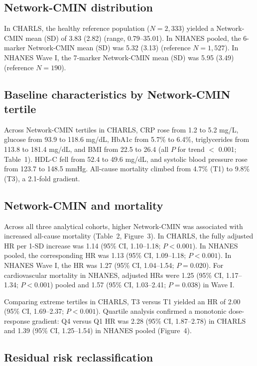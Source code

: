 \documentclass[11pt,a4paper]{article}
\begin{document}
\subsection{Network-CMIN distribution}

In CHARLS, the healthy reference population ($N = 2{,}333$) yielded a Network-CMIN mean (SD) of 3.83 (2.82) (range, 0.79--35.01). In NHANES pooled, the 6-marker Network-CMIN mean (SD) was 5.32 (3.13) (reference $N = 1{,}527$). In NHANES Wave I, the 7-marker Network-CMIN mean (SD) was 5.95 (3.49) (reference $N = 190$).

\subsection{Baseline characteristics by Network-CMIN tertile}

Across Network-CMIN tertiles in CHARLS, CRP rose from 1.2 to 5.2 mg/L, glucose from 93.9 to 118.6 mg/dL, HbA1c from 5.7\% to 6.4\%, triglycerides from 113.8 to 181.4 mg/dL, and BMI from 22.5 to 26.4 (all $P$ for trend $<$ 0.001; Table~1). HDL-C fell from 52.4 to 49.6 mg/dL, and systolic blood pressure rose from 123.7 to 148.5 mmHg. All-cause mortality climbed from 4.7\% (T1) to 9.8\% (T3), a 2.1-fold gradient.

\subsection{Network-CMIN and mortality}

Across all three analytical cohorts, higher Network-CMIN was associated with increased all-cause mortality (Table~2, Figure~3). In CHARLS, the fully adjusted HR per 1-SD increase was 1.14 (95\% CI, 1.10--1.18; $P < 0.001$). In NHANES pooled, the corresponding HR was 1.13 (95\% CI, 1.09--1.18; $P < 0.001$). In NHANES Wave I, the HR was 1.27 (95\% CI, 1.04--1.54; $P = 0.020$). For cardiovascular mortality in NHANES, adjusted HRs were 1.25 (95\% CI, 1.17--1.34; $P < 0.001$) pooled and 1.57 (95\% CI, 1.03--2.41; $P = 0.038$) in Wave I.

Comparing extreme tertiles in CHARLS, T3 versus T1 yielded an HR of 2.00 (95\% CI, 1.69--2.37; $P < 0.001$). Quartile analysis confirmed a monotonic dose-response gradient: Q4 versus Q1 HR was 2.28 (95\% CI, 1.87--2.78) in CHARLS and 1.39 (95\% CI, 1.25--1.54) in NHANES pooled (Figure~4).

\subsection{Residual risk reclassification}
\end{document}
